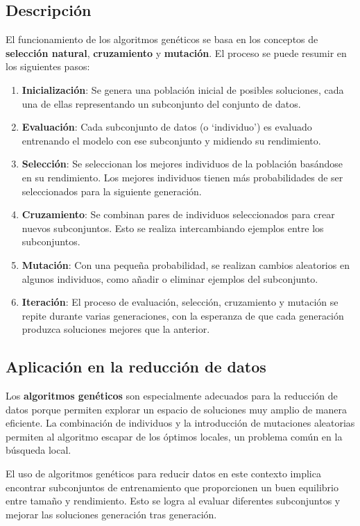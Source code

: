 \subsection{Descripción}\label{subsec:descripcion3}
El funcionamiento de los algoritmos genéticos se basa en los conceptos de \textbf{selección natural},
\textbf{cruzamiento} y \textbf{mutación}.
El proceso se puede resumir en los siguientes pasos:
\begin{enumerate}
    \item \textbf{Inicialización}: Se genera una población inicial de posibles soluciones, cada una de ellas
          representando un subconjunto del conjunto de datos.
    \item \textbf{Evaluación}: Cada subconjunto de datos (o `individuo') es evaluado entrenando el modelo con ese
          subconjunto y midiendo su rendimiento.
    \item \textbf{Selección}: Se seleccionan los mejores individuos de la población basándose en su rendimiento.
          Los mejores individuos tienen más probabilidades de ser seleccionados para la siguiente generación.
    \item \textbf{Cruzamiento}: Se combinan pares de individuos seleccionados para crear nuevos subconjuntos.
          Esto se realiza intercambiando ejemplos entre los subconjuntos.
    \item \textbf{Mutación}: Con una pequeña probabilidad, se realizan cambios aleatorios en algunos individuos, como
          añadir o eliminar ejemplos del subconjunto.
    \item \textbf{Iteración}: El proceso de evaluación, selección, cruzamiento y mutación se repite durante varias
          generaciones, con la esperanza de que cada generación produzca soluciones mejores que la anterior.
\end{enumerate}

\subsection{Aplicación en la reducción de datos}\label{subsec:aplicacion-en-la-reduccion-de-datos3}
Los \textbf{algoritmos genéticos} son especialmente adecuados para la reducción de datos porque permiten explorar un
espacio de soluciones muy amplio de manera eficiente.
La combinación de individuos y la introducción de mutaciones aleatorias permiten al algoritmo escapar de los óptimos
locales, un problema común en la búsqueda local.

El uso de algoritmos genéticos para reducir datos en este contexto implica encontrar subconjuntos de entrenamiento que
proporcionen un buen equilibrio entre tamaño y rendimiento.
Esto se logra al evaluar diferentes subconjuntos y mejorar las soluciones generación tras generación.

